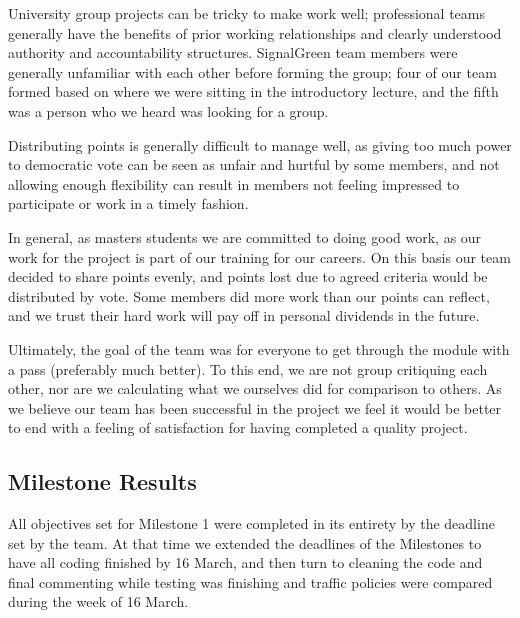 \documentclass[11pt]{article}
\begin{document}
\begin{enumerate}
University group projects can be tricky to make work well; professional teams generally have the benefits of prior working relationships and clearly understood authority and accountability structures. SignalGreen team members were generally unfamiliar with each other before forming the group; four of our team formed based on where we were sitting in the introductory lecture, and the fifth was a person who we heard was looking for a group. 

Distributing points is generally difficult to manage well, as giving too much power to democratic vote can be seen as unfair and hurtful by some members, and not allowing enough flexibility can result in members not feeling impressed to participate or work in a timely fashion. 

In general, as masters students we are committed to doing good work, as our work for the project is part of our training for our careers. On this basis our team decided to share points evenly, and points lost due to agreed criteria would be distributed by vote. Some members did more work than our points can reflect, and we trust their hard work will pay off in personal dividends in the future.

Ultimately, the goal of the team was for everyone to get through the module with a pass (preferably much better). To this end, we are not group critiquing each other, nor are we calculating what we ourselves did for comparison to others. As we believe our team has been successful in the project we feel it would be better to end with a feeling of satisfaction for having completed a quality project.


\subsection{Milestone Results}

All objectives set for Milestone 1 were completed in its entirety by the deadline set by the team. At that time we extended the deadlines of the Milestones to have all coding finished by 16 March, and then turn to cleaning the code and final commenting while testing was finishing and traffic policies were compared during the week of 16 March.
\\



\end{enumerate}
\end{document}
